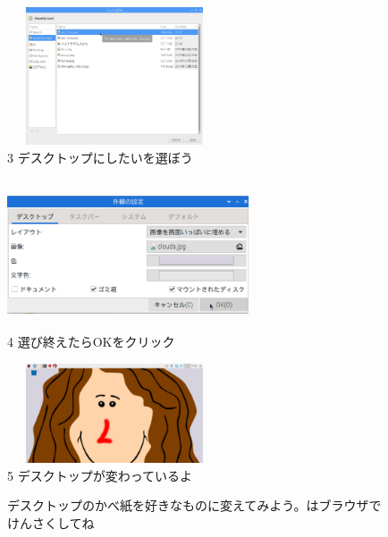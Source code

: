 \documentclass[a4paper,12pt]{jarticle}
\begin{document}
\begin{figure}
\begin{minipage}{\textwidth}
    \begin{minipage}{6.376cm}
      \includegraphics[width=6.347cm,height=4.084cm]{textbook-img110.png}\\
      3 デスクトップにしたいを選ぼう
    \end{minipage}
    \begin{minipage}{2.582cm}
    \end{minipage}
    \begin{minipage}{5.737cm}
      \includegraphics[width=7.145cm,height=4.451cm]{textbook-img109.png}\\
      4 選び終えたらOKをクリック
    \end{minipage}

  \end{minipage}

  \bigskip


  \flushleft
  \begin{minipage}{6.134cm}
    \includegraphics[width=6.347cm,height=2.945cm]{textbook-img111.png}\\
    5 デスクトップが変わっているよ
  \end{minipage}

  \bigskip

  \theQuestion\label{Q:hasAnswer02-7}

  デスクトップのかべ紙を好きなものに変えてみよう。はブラウザでけんさくしてね
\end{figure}
\end{document}
